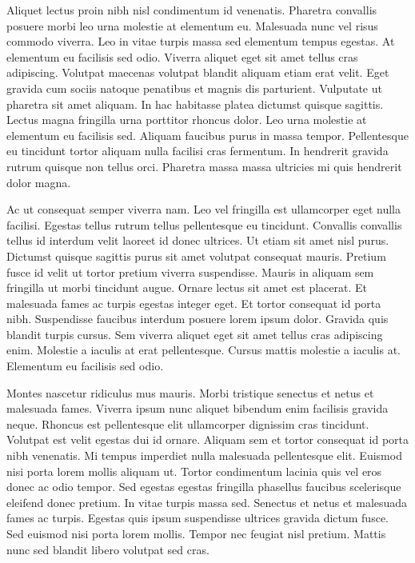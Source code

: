 Aliquet lectus proin nibh nisl condimentum id venenatis. Pharetra convallis posuere morbi leo urna molestie at elementum eu. Malesuada nunc vel risus commodo viverra. Leo in vitae turpis massa sed elementum tempus egestas. At elementum eu facilisis sed odio. Viverra aliquet eget sit amet tellus cras adipiscing. Volutpat maecenas volutpat blandit aliquam etiam erat velit. Eget gravida cum sociis natoque penatibus et magnis dis parturient. Vulputate ut pharetra sit amet aliquam. In hac habitasse platea dictumst quisque sagittis. Lectus magna fringilla urna porttitor rhoncus dolor. Leo urna molestie at elementum eu facilisis sed. Aliquam faucibus purus in massa tempor. Pellentesque eu tincidunt tortor aliquam nulla facilisi cras fermentum. In hendrerit gravida rutrum quisque non tellus orci. Pharetra massa massa ultricies mi quis hendrerit dolor magna.

Ac ut consequat semper viverra nam. Leo vel fringilla est ullamcorper eget nulla facilisi. Egestas tellus rutrum tellus pellentesque eu tincidunt. Convallis convallis tellus id interdum velit laoreet id donec ultrices. Ut etiam sit amet nisl purus. Dictumst quisque sagittis purus sit amet volutpat consequat mauris. Pretium fusce id velit ut tortor pretium viverra suspendisse. Mauris in aliquam sem fringilla ut morbi tincidunt augue. Ornare lectus sit amet est placerat. Et malesuada fames ac turpis egestas integer eget. Et tortor consequat id porta nibh. Suspendisse faucibus interdum posuere lorem ipsum dolor. Gravida quis blandit turpis cursus. Sem viverra aliquet eget sit amet tellus cras adipiscing enim. Molestie a iaculis at erat pellentesque. Cursus mattis molestie a iaculis at. Elementum eu facilisis sed odio.

Montes nascetur ridiculus mus mauris. Morbi tristique senectus et netus et malesuada fames. Viverra ipsum nunc aliquet bibendum enim facilisis gravida neque. Rhoncus est pellentesque elit ullamcorper dignissim cras tincidunt. Volutpat est velit egestas dui id ornare. Aliquam sem et tortor consequat id porta nibh venenatis. Mi tempus imperdiet nulla malesuada pellentesque elit. Euismod nisi porta lorem mollis aliquam ut. Tortor condimentum lacinia quis vel eros donec ac odio tempor. Sed egestas egestas fringilla phasellus faucibus scelerisque eleifend donec pretium. In vitae turpis massa sed. Senectus et netus et malesuada fames ac turpis. Egestas quis ipsum suspendisse ultrices gravida dictum fusce. Sed euismod nisi porta lorem mollis. Tempor nec feugiat nisl pretium. Mattis nunc sed blandit libero volutpat sed cras.

